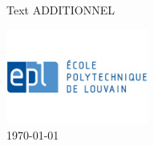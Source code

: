 \documentclass{article}
\begin{document}
\begin{titlepage}
\begin{sffamily}
\begin{center}
       \vfill
       	    
        \begin{flushright} \large
            Text ADDITIONNEL \\[1cm]
        \end{flushright}
        
        \includegraphics[width=0.35\textwidth]{logo_epl.jpg}
     \\[0.7cm]
    {\large \today }

  \end{center}
  \end{sffamily}
\end{titlepage}
\end{document}
